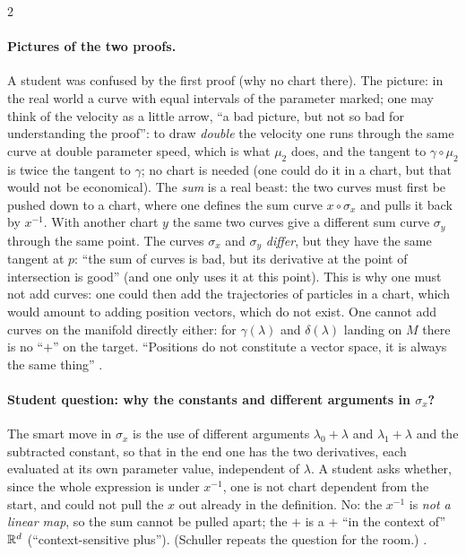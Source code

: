 \begin{paracol}{2}
\paragraph{Pictures of the two proofs.} A student was confused by the first proof (why no chart there). The picture: in the real world a curve with equal intervals of the parameter marked; one may think of the velocity as a little arrow, ``a bad picture, but not so bad for understanding the proof'': to draw \emph{double} the velocity one runs through the same curve at double parameter speed, which is what $\mu_2$ does,
and the tangent to $\gamma\circ\mu_2$ is twice the tangent to $\gamma$; no chart is needed (one could do it in a chart, but that would not be economical). The \emph{sum} is a real beast: the two curves must first be pushed down to a chart, where one defines the sum curve $x\circ\sigma_x$ and pulls it back by $x^{-1}$. With another chart $y$ the same two curves
give a different sum curve $\sigma_y$ through the same point. The curves $\sigma_x$ and $\sigma_y$ \emph{differ}, but they have the same tangent at $p$: ``the sum of curves is bad, but its derivative at the point of intersection is good'' (and one only uses it at this point). This is why one must not add curves: one could then add the trajectories of particles in a chart, which would amount to adding position vectors, which do not exist.
One cannot add curves on the manifold directly either: for $\gamma(\lambda)$ and $\delta(\lambda)$ landing on $M$ there is no ``$+$'' on the target. ``Positions do not constitute a vector space, it is always the same thing''
.

\paragraph{Student question: why the constants and different arguments in $\sigma_x$?} The smart move in $\sigma_x$ is the use of different arguments $\lambda_0+\lambda$ and $\lambda_1+\lambda$ and the subtracted constant, so that in the end one has the two derivatives, each evaluated at its own parameter value, independent of $\lambda$. A student asks whether, since the whole expression is under $x^{-1}$, one is not chart dependent from the start, and could not pull the $x$ out already
in the definition. No: the $x^{-1}$ is \emph{not a linear map}, so the sum cannot be pulled apart; the $+$ is a $+$ ``in the context of'' $\mathbb{R}^d$ (``context-sensitive plus''). (Schuller repeats the question for the room.) .


\end{paracol}

